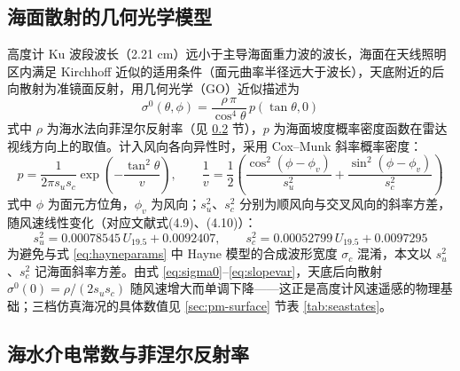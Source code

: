 \documentclass[a4paper]{article}
\newcommand{\reftab}[1]{表 \ref{#1}}
\begin{document}
\subsection{海面散射的几何光学模型}
\label{sec:scatter}

高度计 Ku 波段波长（2.21 cm）远小于主导海面重力波的波长，海面在天线照明区内满足 Kirchhoff 近似的适用条件（面元曲率半径远大于波长），天底附近的后向散射为准镜面反射，用几何光学（GO）近似描述为
\begin{equation}
	\sigma^0(\theta, \phi) = \frac{\rho\, \pi}{\cos^{4} \theta}\, p\!\left( \tan\theta, 0 \right)
	\label{eq:sigma0}
\end{equation}
式中 $\rho$ 为海水法向菲涅尔反射率（见 \ref{sec:dielectric} 节），$p$ 为海面坡度概率密度函数在雷达视线方向上的取值。计入风向各向异性时，采用 Cox--Munk 斜率概率密度\cite{coxmunk1954}：
\begin{equation}
	p = \frac{1}{2 \pi s_u s_c} \exp\!\left( -\frac{\tan^{2} \theta}{v} \right), \qquad \frac{1}{v} = \frac{1}{2} \left( \frac{\cos^{2}(\phi - \phi_v)}{s_u^{2}} + \frac{\sin^{2}(\phi - \phi_v)}{s_c^{2}} \right)
	\label{eq:vdef}
\end{equation}
式中 $\phi$ 为面元方位角，$\phi_v$ 为风向；$s_u^{2}$、$s_c^{2}$ 分别为顺风向与交叉风向的斜率方差，随风速线性变化（对应文献\cite{refpaper}式(4.9)、(4.10)）：
\begin{equation}
	s_u^{2} = 0.00078545\, U_{19.5} + 0.0092407, \qquad s_c^{2} = 0.00052799\, U_{19.5} + 0.0097295
	\label{eq:slopevar}
\end{equation}
为避免与式 \eqref{eq:hayneparams} 中 Hayne 模型的合成波形宽度 $\sigma_c$ 混淆，本文以 $s_u^{2}$、$s_c^{2}$ 记海面斜率方差。由式 \eqref{eq:sigma0}--\eqref{eq:slopevar}，天底后向散射 $\sigma^0(0) = \rho / (2 s_u s_c)$ 随风速增大而单调下降——这正是高度计风速遥感的物理基础；三档仿真海况的具体数值见 \ref{sec:pm-surface} 节\reftab{tab:seastates}。

\subsection{海水介电常数与菲涅尔反射率}
\label{sec:dielectric}
\end{document}

